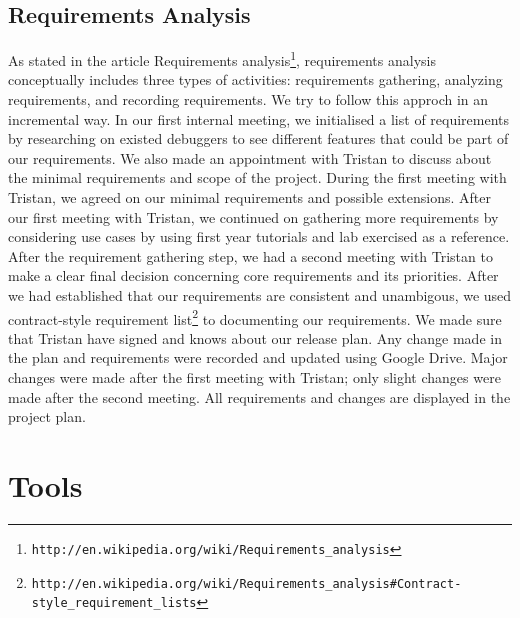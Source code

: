 \documentclass[11pt]{article}
\begin{document}
\subsection{Requirements Analysis}
As stated in the article Requirements analysis\footnote{\tt{http://en.wikipedia.org/wiki/Requirements\_analysis}}, requirements analysis conceptually includes three types of activities: requirements gathering, analyzing requirements, and recording requirements. We try to follow this approch in an incremental way. In our first internal meeting, we initialised a list of requirements by researching on existed debuggers to see different features that could be part of our requirements. We also made an appointment with Tristan to discuss about the minimal requirements and scope of the project. During the first meeting with Tristan, we agreed on our minimal requirements and possible extensions. After our first meeting with Tristan, we continued on gathering more requirements by considering use cases by using first year tutorials and lab exercised as a reference.
After the requirement gathering step, we had a second meeting with Tristan to make a clear final decision concerning core requirements and its priorities. After we had established that our requirements are consistent and unambigous, we used contract-style requirement list\footnote{\tt{http://en.wikipedia.org/wiki/Requirements\_analysis\#Contract-style\_requirement\_lists}} to documenting our requirements. We made sure that Tristan have signed and knows about our release plan.
Any change made in the plan and requirements were recorded and updated using Google Drive. Major changes were made after the first meeting with Tristan; only slight changes were made after the second meeting.
All requirements and changes are displayed in the project plan.

\section{Tools}
\end{document}
